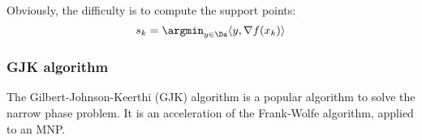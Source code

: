Obviously, the difficulty is to compute the support points:
\begin{equation*}
    s_k = \argmin_{y\in\Ds} \langle y, \nabla f(x_k)\rangle
\end{equation*}

\subsubsection{GJK algorithm}
The Gilbert-Johnson-Keerthi (GJK) algorithm is a popular algorithm to solve the narrow phase problem. It is an acceleration of the Frank-Wolfe algorithm, applied to an MNP.